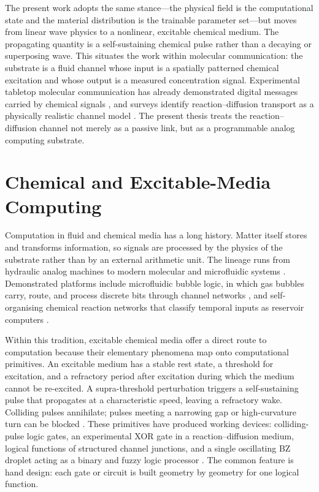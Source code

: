 The present work adopts the same stance---the physical field is the computational state and the material distribution is the trainable parameter set---but moves from linear wave physics to a nonlinear, excitable chemical medium.
The propagating quantity is a self-sustaining chemical pulse rather than a decaying or superposing wave.
This situates the work within molecular communication: the substrate is a fluid channel whose input is a spatially patterned chemical excitation and whose output is a measured concentration signal.
Experimental tabletop molecular communication has already demonstrated digital messages carried by chemical signals \cite{farsad2013tabletop}, and surveys identify reaction--diffusion transport as a physically realistic channel model \cite{farsad2016comprehensive}.
The present thesis treats the reaction--diffusion channel not merely as a passive link, but as a programmable analog computing substrate.

\section{Chemical and Excitable-Media Computing}
\label{sec:lit_chemical}

Computation in fluid and chemical media has a long history.
Matter itself stores and transforms information, so signals are processed by the physics of the substrate rather than by an external arithmetic unit.
The lineage runs from hydraulic analog machines to modern molecular and microfluidic systems \cite{adamatzky2019liquid}.
Demonstrated platforms include microfluidic bubble logic, in which gas bubbles carry, route, and process discrete bits through channel networks \cite{prakash2007bubble}, and self-organising chemical reaction networks that classify temporal inputs as reservoir computers \cite{baltussen2024chemical}.

Within this tradition, excitable chemical media offer a direct route to computation because their elementary phenomena map onto computational primitives.
An excitable medium has a stable rest state, a threshold for excitation, and a refractory period after excitation during which the medium cannot be re-excited.
A supra-threshold perturbation triggers a self-sustaining pulse that propagates at a characteristic speed, leaving a refractory wake.
Colliding pulses annihilate; pulses meeting a narrowing gap or high-curvature turn can be blocked \cite{courtemanche1993instabilities}.
These primitives have produced working devices: colliding-pulse logic gates, an experimental XOR gate in a reaction--diffusion medium, logical functions of structured channel junctions, and a single oscillating BZ droplet acting as a binary and fuzzy logic processor \cite{toth1995logic, steinbock1996chemical, adamatzky2002xor, adamatzky2002collision, sielewiesiuk2001logical, gorecki2009information, gentili2012chemical}.
The common feature is hand design: each gate or circuit is built geometry by geometry for one logical function.

